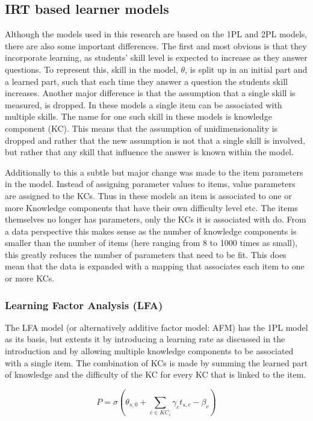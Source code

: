 \documentclass{scrartcl}
\begin{document}
\subsection{IRT based learner models}
Although the models used in this research are based on the 1PL and 2PL models, there are also some important differences. The first and most obvious is that they incorporate learning, as students' skill level is expected to increase as they answer questions. To represent this, skill in the model, $\theta$, is split up in an initial part and a learned part, such that each time they answer a question the students skill increases. 
Another major difference is that the assumption that a single skill is measured, is dropped. In these models a single item can be associated with multiple skills. The name for one such skill in these models is knowledge component (KC). This means that the assumption of unidimensionality is dropped and rather that the new assumption is not that a single skill is involved, but rather that any skill that influence the answer is known within the model.

Additionally to this a subtle but major change was made to the item parameters in the model. Instead of assigning parameter values to items, value parameters are assigned to the KCs. Thus in these models an item is associated to one or more Knowledge components that have their own difficulty level etc. The items themselves no longer has parameters, only the KCs it is associated with do. From a data perspective this makes sense as the number of knowledge components is smaller than the number of items (here ranging from 8 to 1000 times as small), this greatly reduces the number of parameters that need to be fit. This does mean that the data is expanded with a mapping that associates each item to one or more KCs. 

\subsubsection{Learning Factor Analysis (LFA)}
\label{sec:AFM}
The LFA model (or alternatively additive factor model: AFM) has the 1PL model as its basis, but extents it by introducing a learning rate as discussed in the introduction and by allowing multiple knowledge components to be associated with a single item. The combination of KCs is made by summing the learned part of knowledge and the difficulty of the KC for every KC that is linked to the item.

\begin{equation}
\label{eq:afm}
P = \sigma(\theta_{s,0} + \sum_{c \in KC_{i}}  \gamma_{c} t_{s,c} - \beta_{c})
\end{equation}
\end{document}
